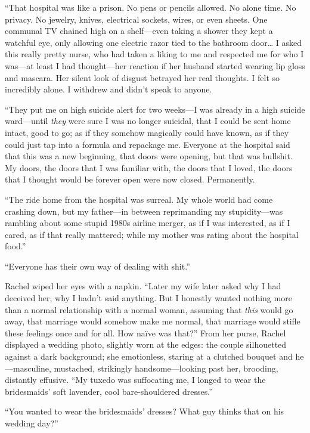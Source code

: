 ``That hospital was like a prison. No pens or pencils allowed. No alone
time. No privacy. No jewelry, knives, electrical sockets, wires, or even
sheets. One communal TV chained high on a shelf---even taking a shower
they kept a watchful eye, only allowing one electric razor tied to the
bathroom door\ldots{} I asked this really pretty nurse, who had taken a
liking to me and respected me for who I was---at least I had
thought---her reaction if her husband started wearing lip gloss and
mascara. Her silent look of disgust betrayed her real thoughts. I felt
so incredibly alone. I withdrew and didn't speak to anyone.

``They put me on high suicide alert for two weeks---I was already in a
high suicide ward---until \emph{they} were sure I was no longer
suicidal, that I could be sent home intact, good to go; as if they
somehow magically could have known, as if they could just tap into a
formula and repackage me. Everyone at the hospital said that this was a
new beginning, that doors were opening, but that was bullshit. My doors,
the doors that I was familiar with, the doors that I loved, the doors
that I thought would be forever open were now closed. Permanently.

``The ride home from the hospital was surreal. My whole world had come
crashing down, but my father---in between reprimanding my
stupidity---was rambling about some stupid 1980s airline merger, as if I
was interested, as if I cared, as if that really mattered; while my
mother was rating about the hospital food.''

``Everyone has their own way of dealing with shit.''

Rachel wiped her eyes with a napkin. ``Later my wife later asked why I
had deceived her, why I hadn't said anything. But I honestly wanted
nothing more than a normal relationship with a normal woman, assuming
that \emph{this} would go away, that marriage would somehow make me
normal, that marriage would stifle these feelings once and for all. How
naïve was that?'' From her purse, Rachel displayed a wedding photo,
slightly worn at the edges: the couple silhouetted against a dark
background; she emotionless, staring at a clutched bouquet and
he---masculine, mustached, strikingly handsome---looking past her,
brooding, distantly effusive. ``My tuxedo was suffocating me, I longed
to wear the bridesmaids' soft lavender, cool bare-shouldered dresses.''

``You wanted to wear the bridesmaids' dresses? What guy thinks that on
his wedding day?''

